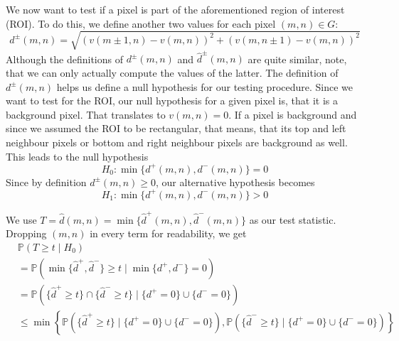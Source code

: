 \documentclass[a4paper,12pt]{article}
\theoremstyle{plain}
\theoremstyle{definition}
\theoremstyle{remark}
\begin{document}
We now want to test if a pixel is part of the aforementioned region of interest (ROI). To do this, we define another two values for each pixel $(m, n) \in G$:
\begin{equation}\label{d}
	d^\pm(m, n) = \sqrt{(v(m \pm 1, n) - v(m, n))^2 + (v(m, n \pm 1) - v(m, n))^2}
\end{equation}
Although the definitions of $d^\pm(m, n)$ and $\hat{d}^\pm(m, n)$ are quite similar, note, that we can only actually compute the values of the latter. The definition of $d^\pm(m, n)$ helps us define a null hypothesis for our testing procedure. Since we want to test for the ROI, our null hypothesis for a given pixel is, that it is a background pixel. That translates to $v(m, n) = 0$. If a pixel is background and since we assumed the ROI to be rectangular, that means, that its top and left neighbour pixels or bottom and right neighbour pixels are background as well. This leads to the null hypothesis
\begin{equation}
	H_0 : \min\{ d^+(m, n), d^-(m, n) \} = 0
\end{equation}
Since by definition $d^\pm(m, n) \geq 0$, our alternative hypothesis becomes
\begin{equation}
	H_1 : \min\{ d^+(m, n), d^-(m, n) \} > 0
\end{equation}

We use $T = \hat{d}(m, n) = \min \{ \hat{d}^+(m, n), \hat{d}^-(m, n) \}$ as our test statistic. Dropping $(m, n)$ in every term for readability, we get
\begin{align*}
	&\mathbb{P}(T \geq t \mid H_0) \\
	&= \mathbb{P}(\min \{ \hat{d}^+, \hat{d}^- \} \geq t \mid \min\{ d^+, d^- \} = 0) \\
	&= \mathbb{P}(\{ \hat{d}^+ \geq t \} \cap \{ \hat{d}^- \geq t \} \mid \{ d^+ = 0 \} \cup \{ d^- = 0 \}) \\
	&\leq \min \left\{ \mathbb{P}(\{ \hat{d}^+ \geq t \} \mid \{ d^+ = 0 \} \cup \{ d^- = 0 \}), \mathbb{P}(\{ \hat{d}^- \geq t \} \mid \{ d^+ = 0 \} \cup \{ d^- = 0 \}) \right\}
\end{align*}
\end{document}
